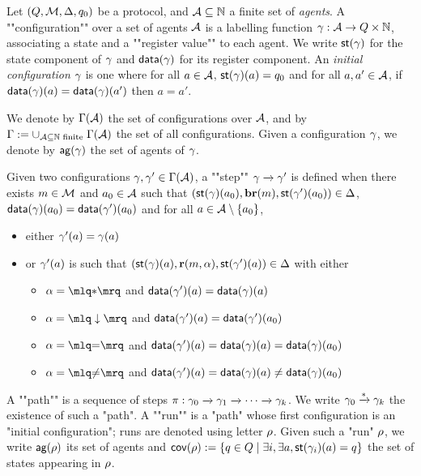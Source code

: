 \begin{definition}
	Let $(Q,\mathcal{M}, \Delta, q_0)$ be a protocol, and $\mathcal{A} \subseteq \mathbb{N}$ a finite set of \emph{agents}.
	A ""configuration"" over a set of agents $\mathcal{A}$ is a labelling function $\gamma : \mathcal{A} \to Q \times \mathbb{N}$, associating a state and a ""register value"" to each agent. We write $\mathsf{st}(\gamma)$ for the state component of $\gamma$ and $\mathsf{data}(\gamma)$ for its register component. 
	An \emph{initial configuration} $\gamma$ is one where for all $a \in \mathcal{A}$, $\mathsf{st}(\gamma)(a) = q_0$ and for all $a, a' \in \mathcal{A}$, if $\mathsf{data}(\gamma)(a) = \mathsf{data}(\gamma)(a')$ then $a=a'$.
	
	\AP We denote by $\Gamma(\mathcal{A})$ the set of configurations over $\mathcal{A}$, and by $\Gamma := \cup_{\mathcal{A} \subseteq \mathbb{N} \text{ finite }} \Gamma(\mathcal{A})$ the set of all configurations. Given a configuration $\gamma$, we denote by $\mathsf{ag}(\gamma)$ the set of agents of $\gamma$.

	\AP Given two configurations $\gamma, \gamma' \in \Gamma(\mathcal{A})$, a ""step"" $\gamma \xrightarrow{} \gamma'$ is defined when there exists $m \in \mathcal{M}$ and $a_0 \in \mathcal{A}$ such that $(\mathsf{st}(\gamma)(a_0),\textbf{br}(m), \mathsf{st}(\gamma')(a_0)) \in \Delta$, $\mathsf{data}(\gamma)(a_0) = \mathsf{data}(\gamma')(a_0)$ and for all $a \in \mathcal{A}\setminus \{a_0\}$,  
	\begin{itemize}
		\item either $\gamma'(a) = \gamma(a)$
		
		\item or $\gamma'(a)$ is such that $(\mathsf{st}(\gamma)(a), \textbf{r}(m, \alpha), \mathsf{st}(\gamma')(a)) \in \Delta$ with either
		\begin{itemize}
			\item $\anact = \quotemarks{\dummyact}$ 
			and $\mathsf{data}(\gamma')(a) = \mathsf{data}(\gamma)(a)$
			\item $\anact = \quotemarks{\enregact}$ and $\mathsf{data}(\gamma')(a) = \mathsf{data}(\gamma')(a_0)$
			\item $\anact = \quotemarks{\eqtestact}$ and $\mathsf{data}(\gamma')(a) = \mathsf{data}(\gamma)(a) =\mathsf{data}(\gamma)(a_0)$
			\item $\anact = \quotemarks{\diseqtestact}$ and $\mathsf{data}(\gamma')(a) = \mathsf{data}(\gamma)(a) \ne \mathsf{data}(\gamma)(a_0)$
		\end{itemize}
	\end{itemize}

	\AP A ""path"" is a sequence of steps $\pi : \gamma_0 \xrightarrow{} \gamma_1 \xrightarrow{} \cdots \xrightarrow{} \gamma_k$. 
We write $\gamma_0 \xrightarrow{*} \gamma_k$ the existence of such a "path".
 A ""run"" is a "path" whose first configuration is an "initial configuration"; runs are denoted using letter $\rho$.  
Given such a "run" $\rho$, we write $\mathsf{ag}(\rho)$ its set of agents and $\mathsf{cov}(\rho):= \{q \in Q \mid \exists i, \exists a, \mathsf{st}(\gamma_i)(a) = q\}$ the set of states appearing in $\rho$.  

\end{definition}

